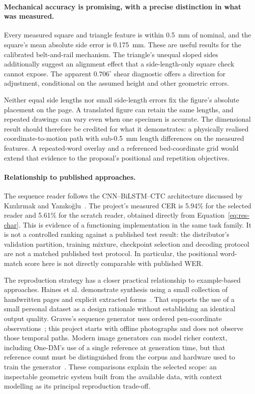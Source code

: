 \paragraph{Mechanical accuracy is promising, with a precise distinction in what was measured.}
Every measured square and triangle feature is within 0.5~mm of nominal, and the square's mean absolute side error is 0.175~mm. These are useful results for the calibrated belt-and-rail mechanism. The triangle's unequal sloped sides additionally suggest an alignment effect that a side-length-only square check cannot expose. The apparent $0.706^\circ$ shear diagnostic offers a direction for adjustment, conditional on the assumed height and other geometric errors.

Neither equal side lengths nor small side-length errors fix the figure's absolute placement on the page. A translated figure can retain the same lengths, and repeated drawings can vary even when one specimen is accurate. The dimensional result should therefore be credited for what it demonstrates: a physically realised coordinate-to-motion path with sub-0.5~mm length differences on the measured features. A repeated-word overlay and a referenced bed-coordinate grid would extend that evidence to the proposal's positional and repetition objectives.

\paragraph{Relationship to published approaches.}
The sequence reader follows the CNN--BiLSTM--CTC architecture discussed by K{\i}z{\i}l{\i}rmak and Yan{\i}ko{\u g}lu~\cite[pp.~4--5]{kizilirmak2023}. The project's measured CER is 5.94\% for the selected reader and 5.61\% for the scratch reader, obtained directly from Equation~\ref{eq:res-char}. This is evidence of a functioning implementation in the same task family. It is not a controlled ranking against a published test result: the distributor's validation partition, training mixture, checkpoint selection and decoding protocol are not a matched published test protocol. In particular, the positional word-match score here is not directly comparable with published WER.

The reproduction strategy has a closer practical relationship to example-based approaches. Haines et al. demonstrate synthesis using a small collection of handwritten pages and explicit extracted forms~\cite[PDF p.~4, Sec.~4]{haines2016}. That supports the use of a small personal dataset as a design rationale without establishing an identical output quality. Graves's sequence generator uses ordered pen-coordinate observations~\cite[p.~18]{graves2013}; this project starts with offline photographs and does not observe those temporal paths. Modern image generators can model richer context, including One-DM's use of a single reference at generation time, but that reference count must be distinguished from the corpus and hardware used to train the generator~\cite[p.~9]{dai2024}. These comparisons explain the selected scope: an inspectable geometric system built from the available data, with context modelling as its principal reproduction trade-off.


